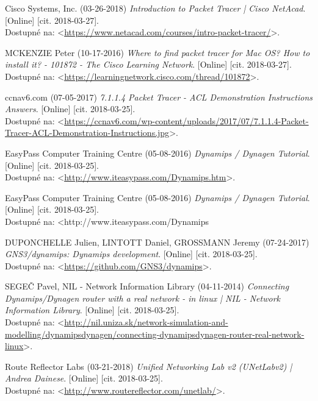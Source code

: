 \begin{thebibliography}{99}
\label{literatura}

Cisco Systems, Inc. (03-26-2018) {\it Introduction to Packet Tracer | Cisco NetAcad}. [Online] [cit. 2018-03-27]. \\ 
Dostupné na: <\url{https://www.netacad.com/courses/intro-packet-tracer/}>.

MCKENZIE Peter (10-17-2016) {\it Where to find packet tracer for Mac OS? How to install it? - 101872 - The Cisco Learning Network}. [Online] [cit. 2018-03-27]. \\ 
Dostupné na: <\url{https://learningnetwork.cisco.com/thread/101872}>.

ccnav6.com (07-05-2017) {\it 7.1.1.4 Packet Tracer - ACL Demonstration Instructions Answers}. [Online] [cit. 2018-03-25]. \\ 
Dostupné na: <\url{https://ccnav6.com/wp-content/uploads/2017/07/7.1.1.4-Packet-Tracer-ACL-Demonstration-Instructions.jpg}>.

EasyPass Computer Training Centre (05-08-2016) {\it Dynamips / Dynagen Tutorial}. [Online] [cit. 2018-03-25]. \\ 
Dostupné na: <\url{http://www.iteasypass.com/Dynamips.htm}>.

EasyPass Computer Training Centre (05-08-2016) {\it Dynamips / Dynagen Tutorial}. [Online] [cit. 2018-03-25]. \\ 
Dostupné na: <http://www.iteasypass.com/Dynamips%

DUPONCHELLE Julien, LINTOTT Daniel, GROSSMANN Jeremy (07-24-2017) {\it GNS3/dynamips: Dynamips development}. [Online] [cit. 2018-03-25]. \\ 
Dostupné na: <\url{https://github.com/GNS3/dynamips}>.

SEGEČ Pavel, NIL - Network Information Library (04-11-2014) {\it Connecting Dynamips/Dynagen router with a real network - in linux | NIL - Network Information Library}. [Online] [cit. 2018-03-25]. \\ 
Dostupné na: <\url{http://nil.uniza.sk/network-simulation-and-modelling/dynamipsdynagen/connecting-dynamipsdynagen-router-real-network-linux}>.

Route Reflector Labs (03-21-2018) {\it Unified Networking Lab v2 (UNetLabv2) | Andrea Dainese}. [Online] [cit. 2018-03-25]. \\
Dostupné na: <\url{http://www.routereflector.com/unetlab/}>.


\end{thebibliography}
